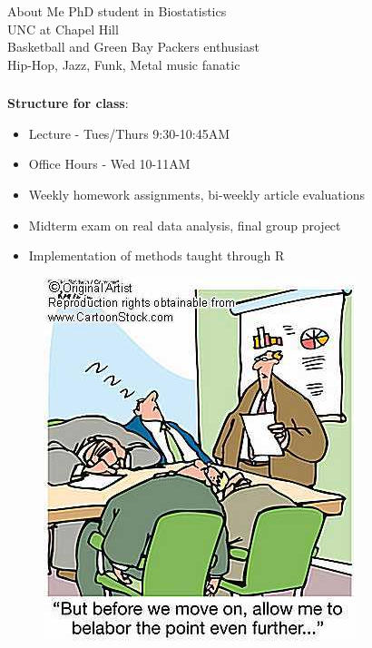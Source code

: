 \documentclass[xcolor=dvipsnames]{beamer}
\begin{document}
\begin{frame}
\frametitle{\insertsectionhead}
\begin{exampleblock}{About Me}
PhD student in Biostatistics\\
UNC at Chapel Hill\\
Basketball and Green Bay Packers enthusiast\\
Hip-Hop, Jazz, Funk, Metal music fanatic
\end{exampleblock}
\end{frame}

\begin{frame}
\frametitle{\insertsectionhead}
\textbf{Structure for class}:
\begin{itemize}
\item Lecture - Tues/Thurs 9:30-10:45AM
\item Office Hours - Wed 10-11AM
\item Weekly homework assignments, bi-weekly article evaluations
\item Midterm exam on real data analysis, final group project
\item Implementation of methods taught through R
\end{itemize}

\begin{figure}
\includegraphics[scale=1.25]{images/boring-lecture.jpg}
\end{figure}

\end{frame}
\end{document}
